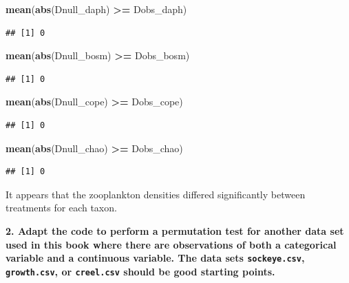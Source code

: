 \documentclass[]{book}
\newenvironment{Shaded}{\begin{snugshade}}{\end{snugshade}}
\newcommand{\KeywordTok}[1]{\textcolor[rgb]{0.13,0.29,0.53}{\textbf{#1}}}
\newcommand{\StringTok}[1]{\textcolor[rgb]{0.31,0.60,0.02}{#1}}
\newcommand{\OperatorTok}[1]{\textcolor[rgb]{0.81,0.36,0.00}{\textbf{#1}}}
\newcommand{\NormalTok}[1]{#1}
\theoremstyle{definition}
\theoremstyle{definition}
\theoremstyle{definition}
\theoremstyle{remark}
\begin{document}
\begin{Shaded}
\begin{Highlighting}[]
\KeywordTok{mean}\NormalTok{(}\KeywordTok{abs}\NormalTok{(Dnull_daph) }\OperatorTok{>=}\StringTok{ }\NormalTok{Dobs_daph)}
\end{Highlighting}
\end{Shaded}

\begin{verbatim}
## [1] 0
\end{verbatim}

\begin{Shaded}
\begin{Highlighting}[]
\KeywordTok{mean}\NormalTok{(}\KeywordTok{abs}\NormalTok{(Dnull_bosm) }\OperatorTok{>=}\StringTok{ }\NormalTok{Dobs_bosm)}
\end{Highlighting}
\end{Shaded}

\begin{verbatim}
## [1] 0
\end{verbatim}

\begin{Shaded}
\begin{Highlighting}[]
\KeywordTok{mean}\NormalTok{(}\KeywordTok{abs}\NormalTok{(Dnull_cope) }\OperatorTok{>=}\StringTok{ }\NormalTok{Dobs_cope)}
\end{Highlighting}
\end{Shaded}

\begin{verbatim}
## [1] 0
\end{verbatim}

\begin{Shaded}
\begin{Highlighting}[]
\KeywordTok{mean}\NormalTok{(}\KeywordTok{abs}\NormalTok{(Dnull_chao) }\OperatorTok{>=}\StringTok{ }\NormalTok{Dobs_chao)}
\end{Highlighting}
\end{Shaded}

\begin{verbatim}
## [1] 0
\end{verbatim}

It appears that the zooplankton densities differed significantly between
treatments for each taxon.

\textbf{2. Adapt the code to perform a permutation test for another data
set used in this book where there are observations of both a categorical
variable and a continuous variable. The data sets \texttt{sockeye.csv},
\texttt{growth.csv}, or \texttt{creel.csv} should be good starting
points.}
\end{document}
